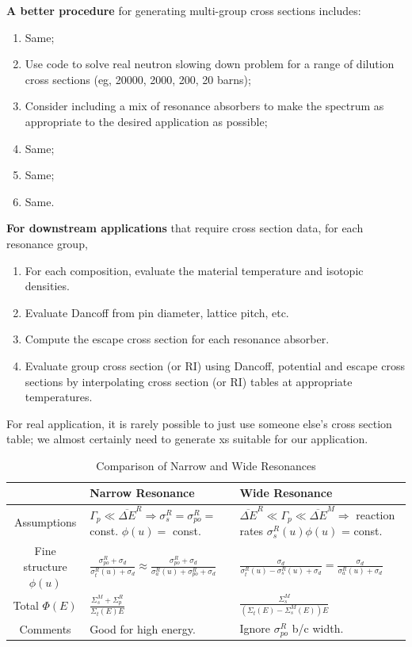 \documentclass{school-22.211-notes}
\begin{document}
\textbf{A better procedure} for generating multi-group cross sections includes:
\begin{enumerate}
\item Same;
\item Use code to solve real neutron slowing down problem for a range of dilution cross sections (eg, 20000, 2000, 200, 20 barns);
\item Consider including a mix of resonance absorbers to make the spectrum as appropriate to the desired application as possible;
\item Same;
\item Same;
\item Same.
\end{enumerate}

\textbf{For downstream applications} that require cross section data, for each resonance group,
\begin{enumerate}
\item For each composition, evaluate the material temperature and isotopic densities. 
\item Evaluate Dancoff from pin diameter, lattice pitch, etc. 
\item Compute the escape cross section for each resonance absorber.
\item Evaluate group cross section (or RI) using Dancoff, potential and escape cross sections by interpolating cross section (or RI) tables at appropriate temperatures. 
\end{enumerate}

For real application, it is rarely possible to just use someone else's cross section table; we almost certainly need to generate xs suitable for our application. 


\begin{table}[ht]
  \centering
  \begin{tabular}{|c|p{2in}|p{2.5in}|} \hline
     & Narrow Resonance & Wide Resonance  \\ \hline
    Assumptions & $\Gamma_p \ll \overline{\Delta E}^R \Rightarrow \sigma_s^R = \sigma_{po}^R = $const. $\phi(u)=$ const.  & $ \overline{\Delta E}^R \ll \Gamma_p \ll \overline{\Delta E}^M \Rightarrow$ reaction rates $\sigma_s^R(u) \phi(u)$ = const. \\ \hline
    Fine structure $\phi(u)$ & $\displaystyle \frac{\sigma_{po}^R + \sigma_d}{\sigma_{t}^R (u) + \sigma_d} \approx \frac{\sigma_{po}^R + \sigma_d}{\sigma_{a}^R(u) + \sigma_{po}^R + \sigma_d }$ &  $\displaystyle \frac{\sigma_d}{\sigma_{t}^R (u) - \sigma_{s}^R (u) + \sigma_d} = \frac{\sigma_d}{\sigma_{a}^R (u) +  \sigma_d }$   \\ \hline
    Total $\Phi (E)$ &  $\displaystyle\frac{\Sigma_s^M + \Sigma_p^R}{\Sigma_t(E) E}$  & $\displaystyle\frac{\Sigma_s^M}{(\Sigma_t(E) - \Sigma_s^M(E))E}$ \\ \hline 
    Comments & Good for high energy.   & Ignore $\sigma_{po}^R$ b/c width.  \\ \hline
  \end{tabular}
  \caption{Comparison of Narrow and Wide Resonances}
\end{table}
\end{document}
